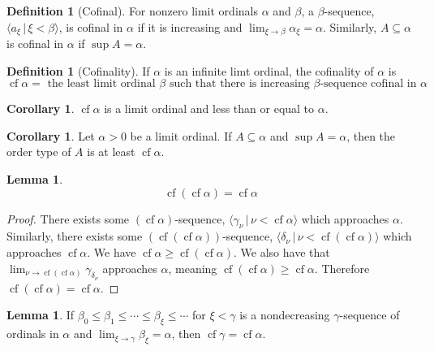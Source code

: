 \documentclass{article}
\theoremstyle{definition}
\newtheorem{crly}[thm]{Corollary}
\newtheorem{defn}[thm]{Definition}
\newtheorem{lmma}[thm]{Lemma}
\DeclareMathOperator{\cf}{cf}
\begin{document}
\newpage

\begin{defn}[Cofinal]
    For nonzero limit ordinals $\alpha$ and $\beta$, a $\beta$-sequence, $\langle a_\xi \, | \, \xi < \beta \rangle$, is cofinal in $\alpha$ if it is increasing and $\lim_{\xi \to \beta} \alpha_\xi = \alpha$. Similarly, $A \subseteq \alpha$ is cofinal in $\alpha$ if $\sup A = \alpha$. 
\end{defn}

\begin{defn}[Cofinality]
    If $\alpha$ is an infinite limt ordinal, the cofinality of $\alpha$ is 
    \[
        \cf \alpha = \text{ the least limit ordinal $\beta$ such that there is increasing $\beta$-sequence cofinal in $\alpha$}
    \]
\end{defn}

\begin{crly}
    $\cf \alpha$ is a limit ordinal and less than or equal to $\alpha$.
\end{crly}

\begin{crly}
    Let $\alpha > 0$ be a limit ordinal. If $A \subseteq \alpha$ and $\sup A = \alpha$, then the order type of $A$ is at least $\cf \alpha$. 
\end{crly}

\begin{lmma}
    \[
        \cf(\cf \alpha) = \cf \alpha    
    \]
\end{lmma}

\begin{proof}
    There exists some $(\cf \alpha)$-sequence, $\langle \gamma_\nu \, | \, \nu < \cf \alpha \rangle$ which approaches $\alpha$. Similarly, there exists some $(\cf (\cf \alpha))$-sequence, $\langle \delta_\nu \, | \, \nu < \cf (\cf \alpha) \rangle$ which approaches $\cf \alpha$. We have $\cf \alpha \ge \cf (\cf \alpha)$. We also have that $\lim_{\nu \to \cf (\cf \alpha)} \gamma_{\delta_\nu}$ approaches $\alpha$, meaning $\cf (\cf \alpha) \ge \cf \alpha$. Therefore $\cf (\cf \alpha) = \cf \alpha$.
\end{proof}

\begin{lmma}
    If $\beta_0 \le \beta_1 \le \cdots \le \beta_\xi \le \cdots$ for $\xi < \gamma$ is a nondecreasing $\gamma$-sequence of ordinals in $\alpha$ and $\lim_{\xi \to \gamma} \beta_\xi = \alpha$, then $\cf \gamma = \cf \alpha$.
\end{lmma}
\end{document}

